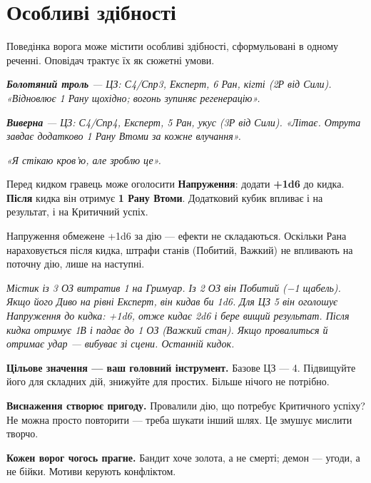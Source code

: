 \documentclass[10pt,a4paper]{article}
\begin{document}
\section*{Особливі здібності}
Поведінка ворога може містити особливі здібності, сформульовані в одному реченні. Оповідач трактує їх як сюжетні умови.

\textbf{\textit{Болотяний троль}}\textit{ — ЦЗ: С4/Спр3, Експерт, 6 Ран, кігті (2Р від Сили). «Відновлює 1 Рану щохідно; вогонь зупиняє регенерацію».}

\textbf{\textit{Виверна}}\textit{ — ЦЗ: С4/Спр4, Експерт, 5 Ран, укус (3Р від Сили). «Літає. Отрута завдає додатково 1 Рану Втоми за кожне влучання».}


\textit{«Я стікаю кров'ю, але зроблю це».}

Перед кидком гравець може оголосити \textbf{Напруження}: додати \textbf{+1d6} до кидка. \textbf{Після} кидка він отримує \textbf{1 Рану Втоми}. Додатковий кубик впливає і на результат, і на Критичний успіх.

Напруження обмежене +1d6 за дію — ефекти не складаються. Оскільки Рана нараховується після кидка, штрафи станів (Побитий, Важкий) не впливають на поточну дію, лише на наступні.

\textit{Містик із 3 ОЗ витратив 1 на Гримуар. Із 2 ОЗ він Побитий (−1 щабель). Якщо його Диво на рівні Експерт, він кидав би 1d6. Для ЦЗ 5 він оголошує Напруження до кидка: +1d6, отже кидає 2d6 і бере вищий результат. Після кидка отримує 1В і падає до 1 ОЗ (Важкий стан). Якщо провалиться й отримає удар — вибуває зі сцени. Останній кидок.}

\begingroup\setlength{\parskip}{5pt plus .5pt minus .5pt}
\textbf{Цільове значення — ваш головний інструмент.} Базове ЦЗ — 4. Підвищуйте його для складних дій, знижуйте для простих. Більше нічого не потрібно.

\textbf{Виснаження створює пригоду.} Провалили дію, що потребує Критичного успіху? Не можна просто повторити — треба шукати інший шлях. Це змушує мислити творчо.

\textbf{Кожен ворог чогось прагне.} Бандит хоче золота, а не смерті; демон — угоди, а не бійки. Мотиви керують конфліктом.
\end{document}
